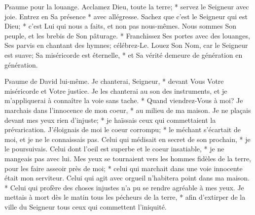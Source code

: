 Psaume pour la louange.
Acclamez Dieu, toute la terre; * servez le Seigneur avec joie. Entrez en Sa présence * avec allégresse.
Sachez que c'est le Seigneur qui est Dieu; * c'est Lui qui nous a faits, et non pas nous-mêmes. Nous sommes Son peuple, et les brebis de Son pâturage. *
Franchissez Ses portes avec des louanges, Ses parvis en chantant des hymnes; célébrez-Le. Louez Son Nom,
car le Seigneur est suave; Sa miséricorde est éternelle, * et Sa vérité demeure de génération en génération.

Psaume de David lui-même. Je chanterai, Seigneur, * devant Vous Votre miséricorde et Votre justice. Je les chanterai au son des instruments,
et je m'appliquerai à connaître la voie sans tache. * Quand viendrez-Vous à moi? Je marchais dans l'innocence de mon coeur, * au milieu de ma maison.
Je ne plaçais devant mes yeux rien d'injuste; * je haïssais ceux qui commettaient la prévarication. J'éloignais de moi
le coeur corrompu; * le méchant s'écartait de moi, et je ne le connaissais pas.
Celui qui médisait en secret de son prochain, * je le poursuivais. Celui dont l'oeil est superbe et le coeur insatiable, * je ne mangeais pas avec lui.
Mes yeux se tournaient vers les hommes fidèles de la terre, pour les faire asseoir près de moi; * celui qui marchait dans une voie innocente était mon serviteur.
Celui qui agit avec orgueil n'habitera point dans ma maison. * Celui qui profère des choses injustes n'a pu se rendre agréable à mes yeux.
Je mettais à mort dès le matin tous les pécheurs de la terre, * afin d'extirper de la ville du Seigneur tous ceux qui commettent l'iniquité.

